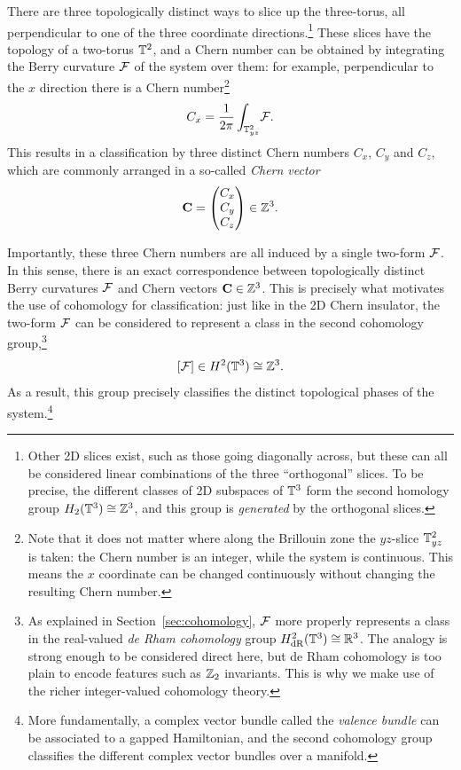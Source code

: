 There are three topologically distinct ways to slice up the three-torus, all perpendicular to one of the three coordinate directions.\footnote{
	Other 2D slices exist, such as those going diagonally across, but these can all be considered linear combinations of the three ``orthogonal'' slices. To be precise, the different classes of 2D subspaces of $\mathbb{T}^3$ form the second homology group $H_2(\mathbb{T}^3)\cong\mathbb{Z}^3$, and this group is \emph{generated} by the orthogonal slices.}
These slices have the topology of a two-torus $\mathbb{T}^2$, and a Chern number can be obtained by integrating the Berry curvature $\mathcal{F}$ of the system over them: for example, perpendicular to the $x$ direction there is a Chern number\footnote{
	Note that it does not matter where along the Brillouin zone the $yz$-slice $\mathbb{T}_{yz}^2$ is taken: the Chern number is an integer, while the system is continuous. This means the $x$ coordinate can be changed continuously without changing the resulting Chern number.}
\begin{equation*}
	C_{x} = \frac{1}{2\pi}\int_{\mathbb{T}_{yz}^2}\!\mathcal{F}.
\end{equation*}
This results in a classification by three distinct Chern numbers $C_x$, $C_y$ and $C_z$, which are commonly arranged in a so-called \emph{Chern vector}
\[
	\vb{C} = \begin{pmatrix}
		C_x \\ C_y \\ C_z
	\end{pmatrix} \in \mathbb{Z}^3.
\]

Importantly, these three Chern numbers are all induced by a single two-form $\mathcal{F}$. In this sense, there is an exact correspondence between topologically distinct Berry curvatures $\mathcal{F}$ and Chern vectors $\vb{C}\in\mathbb{Z}^3$. This is precisely what motivates the use of cohomology for classification: just like in the 2D Chern insulator, the two-form $\mathcal{F}$ can be considered to represent a class in the second cohomology group,\footnote{
	As explained in Section~\ref{sec:cohomology}, $\mathcal{F}$ more properly represents a class in the real-valued \emph{de Rham cohomology} group $H_{\rm dR}^2(\mathbb{T}^3)\cong\mathbb{R}^3$. The analogy is strong enough to be considered direct here, but de Rham cohomology is too plain to encode features such as $\mathbb{Z}_2$ invariants. This is why we make use of the richer integer-valued cohomology theory.} %
\begin{equation}\label{eq:2nd-cohom-t3}
	[\mathcal{F}]\in H^2(\mathbb{T}^3)\cong\mathbb{Z}^3. 
\end{equation}
As a result, this group precisely classifies the distinct topological phases of the system.\footnote{
	More fundamentally, a complex vector bundle called the \emph{valence bundle} can be associated to a gapped Hamiltonian, and the second cohomology group classifies the different complex vector bundles over a manifold.} %

